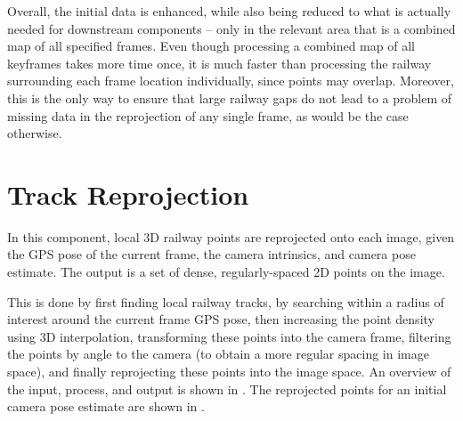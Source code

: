 Overall, the initial data is enhanced, while also being reduced to what is actually needed for downstream components -- only in the relevant area that is a combined map of all specified frames. Even though processing a combined map of all keyframes takes more time once, it is much faster than processing the railway surrounding each frame location individually, since points may overlap. Moreover, this is the only way to ensure that large railway gaps do not lead to a problem of missing data in the reprojection of any single frame, as would be the case otherwise.


\newpage
\section{Track Reprojection}
\label{sec:method_track_reprojection}

In this component, local 3D railway points are reprojected onto each image, given the GPS pose of the current frame, the camera intrinsics, and camera pose estimate. The output is a set of dense, regularly-spaced 2D points on the image.

This is done by first finding local railway tracks, by searching within a radius of interest around the current frame GPS pose, then increasing the point density using 3D interpolation, transforming these points into the camera frame, filtering the points by angle to the camera (to obtain a more regular spacing in image space), and finally reprojecting these points into the image space. An overview of the input, process, and output is shown in . The reprojected points for an initial camera pose estimate are shown in .

